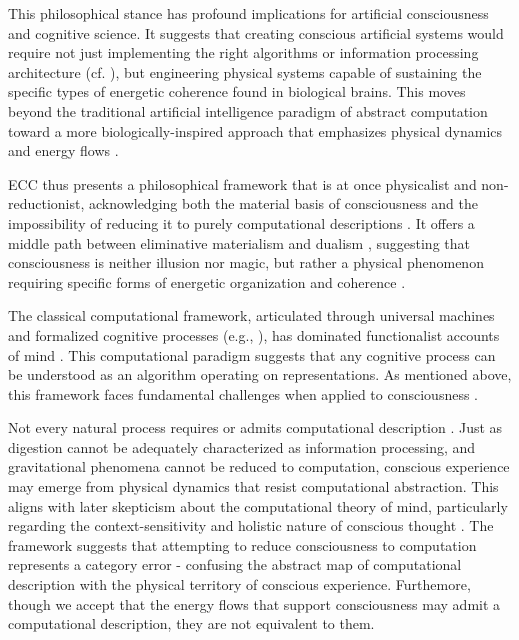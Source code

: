 This philosophical stance has profound implications for artificial consciousness and cognitive science. It suggests that creating conscious artificial systems would require not just implementing the right algorithms or information processing architecture \cite{searle1980minds} (cf. \cite{butlin2023consciousnessartificialintelligenceinsights}), but engineering physical systems capable of sustaining the specific types of energetic coherence found in biological brains. This moves beyond the traditional artificial intelligence paradigm of abstract computation toward a more biologically-inspired approach that emphasizes physical dynamics and energy flows \cite{dreyfus1992computers}.

ECC thus presents a philosophical framework that is at once physicalist and non-reductionist, acknowledging both the material basis of consciousness and the impossibility of reducing it to purely computational descriptions \cite{horst2011symbols}. It offers a middle path between eliminative materialism \cite{churchland1986neurophilosophy} and dualism \cite{chalmers1997conscious}, suggesting that consciousness is neither illusion nor magic, but rather a physical phenomenon requiring specific forms of energetic organization and coherence \cite{jonas2001phenomenon}.

The classical computational framework, articulated through universal machines \cite{turing1936computable} and formalized cognitive processes (e.g., \cite{marr1982vision}), has dominated functionalist accounts of mind \cite{putnam1988representation}. This computational paradigm suggests that any cognitive process can be understood as an algorithm operating on representations. As mentioned above, this framework faces fundamental challenges when applied to consciousness \cite{fodor2000mind}.

Not every natural process requires or admits computational description \cite{rosen1991life}. Just as digestion cannot be adequately characterized as information processing, and gravitational phenomena cannot be reduced to computation, conscious experience may emerge from physical dynamics that resist computational abstraction. This aligns with later skepticism about the computational theory of mind, particularly regarding the context-sensitivity and holistic nature of conscious thought \cite{gibson2014ecological}. The framework suggests that attempting to reduce consciousness to computation represents a category error - confusing the abstract map of computational description with the physical territory of conscious experience. Furthemore, though we accept that the energy flows that support consciousness may admit a computational description, they are not equivalent to them.

